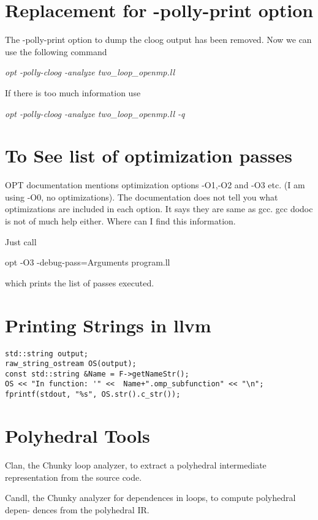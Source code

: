\documentclass[a4paper,10pt]{article}
\begin{document}
\section{Replacement for -polly-print option}

The -polly-print option to dump the cloog output has been removed. Now we can use the following command

\emph{opt -polly-cloog -analyze two\_loop\_openmp.ll}

If there is too much information use

\emph{opt -polly-cloog -analyze two\_loop\_openmp.ll -q}

\section{To See list of optimization passes}

OPT documentation mentions optimization options -O1,-O2 and -O3 etc.
(I am using -O0, no optimizations). The documentation does not tell
 you what optimizations are included in each option.  It says they are
 same as gcc.  gcc dodoc is not of much help either.  Where can I find
 this information.

Just call

opt -O3 -debug-pass=Arguments program.ll

which prints the list of passes executed.

\section{Printing Strings in llvm}

\begin{verbatim}
std::string output;
raw_string_ostream OS(output);
const std::string &Name = F->getNameStr();
OS << "In function: '" <<  Name+".omp_subfunction" << "\n";
fprintf(stdout, "%s", OS.str().c_str());

\end{verbatim}

\section{Polyhedral Tools}

Clan, the Chunky loop analyzer, to extract a polyhedral intermediate representation
  from the source code.

Candl, the Chunky analyzer for dependences in loops, to compute polyhedral depen-
  dences from the polyhedral IR.
\end{document}
